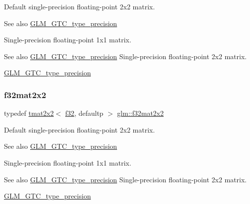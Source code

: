 Default single-\/precision floating-\/point 2x2 matrix. \begin{DoxySeeAlso}{See also}
\hyperlink{group__gtc__type__precision}{G\+L\+M\+\_\+\+G\+T\+C\+\_\+type\+\_\+precision}
\end{DoxySeeAlso}
Single-\/precision floating-\/point 1x1 matrix. \begin{DoxySeeAlso}{See also}
\hyperlink{group__gtc__type__precision}{G\+L\+M\+\_\+\+G\+T\+C\+\_\+type\+\_\+precision} Single-\/precision floating-\/point 2x2 matrix. 

\hyperlink{group__gtc__type__precision}{G\+L\+M\+\_\+\+G\+T\+C\+\_\+type\+\_\+precision} 
\end{DoxySeeAlso}
\mbox{\label{group__gtc__type__precision_gae7ebbb68656a5fd879d536b5d8452fb1}} 
\subsubsection{\texorpdfstring{f32mat2x2}{f32mat2x2}}
{\footnotesize\ttfamily typedef \hyperlink{structglm_1_1tmat2x2}{tmat2x2}$<$ \hyperlink{group__gtc__type__precision_ga0ec999b57f5330d9021256e96038df04}{f32}, defaultp $>$ \hyperlink{group__gtc__type__precision_gae7ebbb68656a5fd879d536b5d8452fb1}{glm\+::f32mat2x2}}

Default single-\/precision floating-\/point 2x2 matrix. \begin{DoxySeeAlso}{See also}
\hyperlink{group__gtc__type__precision}{G\+L\+M\+\_\+\+G\+T\+C\+\_\+type\+\_\+precision}
\end{DoxySeeAlso}
Single-\/precision floating-\/point 1x1 matrix. \begin{DoxySeeAlso}{See also}
\hyperlink{group__gtc__type__precision}{G\+L\+M\+\_\+\+G\+T\+C\+\_\+type\+\_\+precision} Single-\/precision floating-\/point 2x2 matrix. 

\hyperlink{group__gtc__type__precision}{G\+L\+M\+\_\+\+G\+T\+C\+\_\+type\+\_\+precision} 
\end{DoxySeeAlso}
\mbox{\label{group__gtc__type__precision_gac4573d3d213b2bce23943caef565a211}} 
